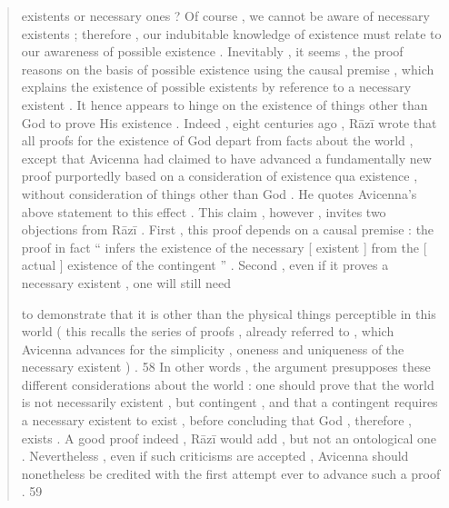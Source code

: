 \begin{quote}
existents or necessary ones ? Of course , we cannot be aware of necessary existents ; therefore , our indubitable knowledge of existence must relate to our awareness of possible existence . Inevitably , it seems , the proof reasons on the basis of possible existence using the causal premise , which explains the existence of possible existents by reference to a necessary existent . It hence appears to hinge on the existence of things other than God to prove His existence . Indeed , eight centuries ago , Rāzī wrote that all proofs for the existence of God depart from facts about the world , except that Avicenna had claimed to have advanced a fundamentally new proof purportedly based on a consideration of existence qua existence , without consideration of things other than God . He quotes Avicenna’s above statement to this effect . This claim , however , invites two objections from Rāzī . First , this proof depends on a causal premise : the proof in fact “ infers the existence of the necessary [ existent ] from the [ actual ] existence of the contingent ” . Second , even if it proves a necessary existent , one will still need

to demonstrate that it is other than the physical things perceptible in this world ( this recalls the series of proofs , already referred to , which Avicenna advances for the simplicity , oneness and uniqueness of the necessary existent ) . 58 In other words , the argument presupposes these different considerations about the world : one should prove that the world is not necessarily existent , but contingent , and that a contingent requires a necessary existent to exist , before concluding that God , therefore , exists . A good proof indeed , Rāzī would add , but not an ontological one . Nevertheless , even if such criticisms are accepted , Avicenna should nonetheless be credited with the first attempt ever to advance such a proof . 59
\end{quote}
